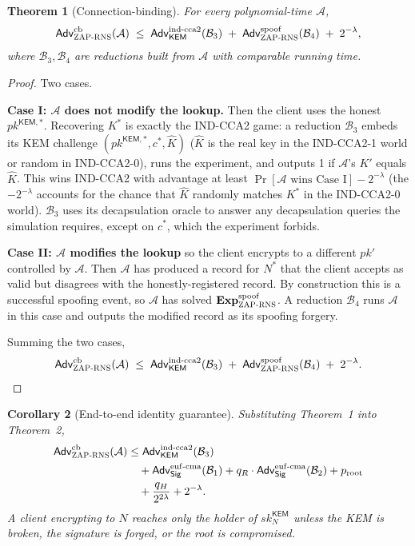 \documentclass[11pt,a4paper]{article}
\newtheorem{theorem}{Theorem}
\newtheorem{corollary}[theorem]{Corollary}
\theoremstyle{definition}
\theoremstyle{remark}
\newcommand{\KEM}{\mathsf{KEM}}
\newcommand{\Sig}{\mathsf{Sig}}
\newcommand{\Adv}{\mathsf{Adv}}
\newcommand{\pk}{\mathit{pk}}
\newcommand{\sk}{\mathit{sk}}
\newcommand{\RNS}{\textsc{ZAP-RNS}}
\begin{document}
\begin{theorem}[Connection-binding]\label{thm:cb}
For every polynomial-time $\mathcal{A}$,
\[
\Adv^{\mathrm{cb}}_{\RNS}(\mathcal{A}) \;\le\;
\Adv^{\mathrm{ind\text{-}cca2}}_{\KEM}(\mathcal{B}_3) \;+\;
\Adv^{\mathrm{spoof}}_{\RNS}(\mathcal{B}_4) \;+\; 2^{-\lambda},
\]
where $\mathcal{B}_3, \mathcal{B}_4$ are reductions built from
$\mathcal{A}$ with comparable running time.
\end{theorem}

\begin{proof}
Two cases.

\textbf{Case I: $\mathcal{A}$ does not modify the lookup.} Then the
client uses the honest $\pk^{\KEM,*}$. Recovering $K^*$ is exactly the
IND-CCA2 game: a reduction $\mathcal{B}_3$ embeds its KEM challenge
$(\pk^{\KEM,*}, c^*, \widehat{K})$ ($\widehat{K}$ is the real key in
the IND-CCA2-1 world or random in IND-CCA2-0), runs the experiment, and
outputs 1 if $\mathcal{A}$'s $K'$ equals $\widehat{K}$. This wins
IND-CCA2 with advantage at least $\Pr[\mathcal{A} \text{ wins
Case I}] - 2^{-\lambda}$ (the $-2^{-\lambda}$ accounts for the chance
that $\widehat{K}$ randomly matches $K^*$ in the IND-CCA2-0 world).
$\mathcal{B}_3$ uses its decapsulation oracle to answer any
decapsulation queries the simulation requires, except on $c^*$, which
the experiment forbids.

\textbf{Case II: $\mathcal{A}$ modifies the lookup} so the client
encrypts to a different $\pk'$ controlled by $\mathcal{A}$. Then
$\mathcal{A}$ has produced a record for $N^*$ that the client accepts
as valid but disagrees with the honestly-registered record. By
construction this is a successful spoofing event, so $\mathcal{A}$ has
solved $\mathbf{Exp}^{\mathrm{spoof}}_{\RNS}$. A reduction
$\mathcal{B}_4$ runs $\mathcal{A}$ in this case and outputs the modified
record as its spoofing forgery.

Summing the two cases,
\[
\Adv^{\mathrm{cb}}_{\RNS}(\mathcal{A}) \;\le\;
\Adv^{\mathrm{ind\text{-}cca2}}_{\KEM}(\mathcal{B}_3) \;+\;
\Adv^{\mathrm{spoof}}_{\RNS}(\mathcal{B}_4) \;+\; 2^{-\lambda}. \qedhere
\]
\end{proof}

\begin{corollary}[End-to-end identity guarantee]
Substituting Theorem~1 into Theorem~2,
\begin{align*}
\Adv^{\mathrm{cb}}_{\RNS}(\mathcal{A})
&\le \Adv^{\mathrm{ind\text{-}cca2}}_{\KEM}(\mathcal{B}_3) \\
&\quad + \Adv^{\mathrm{euf\text{-}cma}}_{\Sig}(\mathcal{B}_1)
+ q_R \cdot \Adv^{\mathrm{euf\text{-}cma}}_{\Sig}(\mathcal{B}_2)
+ p_{\mathrm{root}} \\
&\quad + \frac{q_H}{2^{2\lambda}} + 2^{-\lambda}.
\end{align*}
A client encrypting to $N$ reaches only the holder of $\sk_N^\KEM$
unless the KEM is broken, the signature is forged, or the root is
compromised.
\end{corollary}
\end{document}
